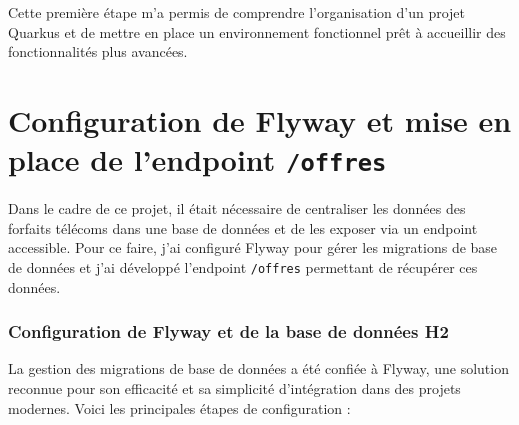 \documentclass{article}
\begin{document}
	Cette première étape m’a permis de comprendre l’organisation d’un projet Quarkus et de mettre en place un environnement fonctionnel prêt à accueillir des fonctionnalités plus avancées.
	
	\section{Configuration de Flyway et mise en place de l'endpoint \texttt{/offres}}
	
	Dans le cadre de ce projet, il était nécessaire de centraliser les données des forfaits télécoms dans une base de données et de les exposer via un endpoint accessible. Pour ce faire, j'ai configuré Flyway pour gérer les migrations de base de données et j'ai développé l'endpoint \texttt{/offres} permettant de récupérer ces données.
	
	\subsubsection{Configuration de Flyway et de la base de données H2}
	
	La gestion des migrations de base de données a été confiée à Flyway, une solution reconnue pour son efficacité et sa simplicité d'intégration dans des projets modernes. Voici les principales étapes de configuration :
	
\end{document}
